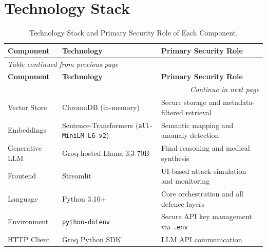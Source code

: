 \section{Technology Stack}

\setlength{\LTleft}{\fill}
\setlength{\LTright}{\fill}

\renewcommand{\arraystretch}{1.05}

\begin{longtable}{|p{3.0cm}|p{4.2cm}|p{4.8cm}|}
\caption{Technology Stack and Primary Security Role of Each Component.}
\label{tab:techstack} \\
\hline
\rowcolor{gray!15}
\textbf{Component} & \textbf{Technology} & \textbf{Primary Security Role} \\
\hline
\endfirsthead

\multicolumn{3}{l}{\small\textit{Table \thetable{} continued from previous page}} \\[2pt]
\hline
\rowcolor{gray!15}
\textbf{Component} & \textbf{Technology} & \textbf{Primary Security Role} \\
\hline
\endhead

\hline
\multicolumn{3}{r}{\small\textit{Continue in next page}} \\
\endfoot

\hline
\endlastfoot

Vector Store      & ChromaDB (in-memory)                          & Secure storage and metadata-filtered retrieval \\
\hline
Embeddings        & Sentence-Transformers (\texttt{all-MiniLM-L6-v2}) & Semantic mapping and anomaly detection \\
\hline
Generative LLM    & Groq-hosted Llama 3.3 70B                    & Final reasoning and medical synthesis \\
\hline
Frontend          & Streamlit                                     & UI-based attack simulation and monitoring \\
\hline
Language          & Python 3.10+                                  & Core orchestration and all defence layers \\
\hline
Environment       & \texttt{python-dotenv}                        & Secure API key management via \texttt{.env} \\
\hline
HTTP Client       & Groq Python SDK                               & LLM API communication \\
\hline

\end{longtable}